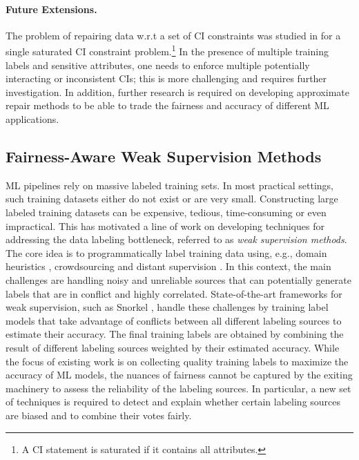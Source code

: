 \documentclass[11pt]{article}
\begin{document}
\paragraph{Future Extensions.}
The problem of repairing data w.r.t a set of CI constraints was studied in \cite{salimi2019interventional} for a single saturated CI constraint problem.\footnote{A CI statement is saturated if it contains all attributes.}  In the presence of multiple training labels and sensitive attributes, one needs to enforce multiple potentially interacting or inconsistent CIs; this is more challenging and requires further investigation. In addition, further research is required on developing approximate repair methods to be able to trade the fairness and accuracy of different ML applications.


\vspace{-0.3cm}
\subsection{Fairness-Aware Weak Supervision Methods}
ML pipelines rely on massive labeled training sets. In most practical settings, such training datasets either do not exist or are very small. Constructing large labeled training datasets can be expensive, tedious, time-consuming or even impractical. This has motivated a line  of work on developing techniques for addressing the data labeling bottleneck, referred to as {\em weak supervision methods}. The core idea is to programmatically label training data using, e.g., domain heuristics \cite{ratner2016data}, crowdsourcing \cite{raykar2010learning} and distant supervision \cite{mintz2009distant}. In this context, the main challenges are handling noisy and unreliable sources that can potentially generate labels that are in conflict and highly correlated.  State-of-the-art frameworks for weak supervision, such as Snorkel \cite{ratner2017snorkel}, handle these challenges by training label models that take advantage of conflicts between all different labeling sources to estimate their accuracy. The final training labels are obtained by combining the result of different  labeling sources weighted by their estimated accuracy. While the focus of existing work is on collecting quality training labels to maximize the accuracy of ML models, the nuances of fairness cannot be captured by the 
exiting machinery to assess the reliability of the labeling sources. In particular, a new set of techniques is required to detect and explain whether certain labeling sources are biased and to combine their votes fairly.
\end{document}
